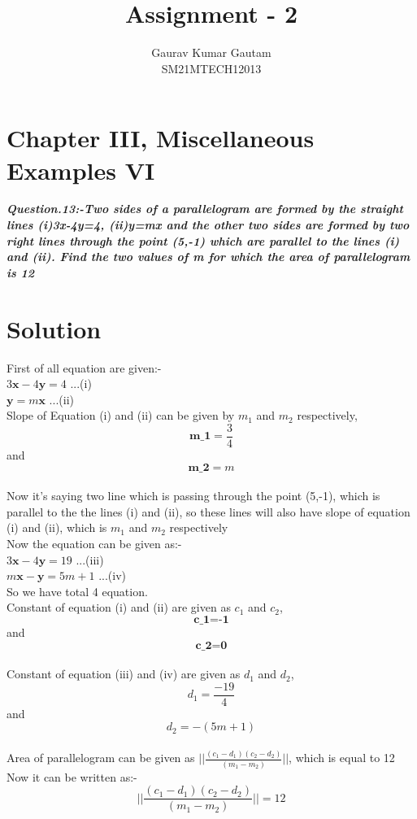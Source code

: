 \documentclass[journal,12pt,twocolumn]{IEEEtran}
\let\vec\mathbf
\begin{document}
\title{
Assignment - 2
}
\author{ Gaurav Kumar Gautam \\SM21MTECH12013}
\maketitle
\newpage
\bigskip

\section*{\textbf{Chapter III, Miscellaneous Examples VI}}
\noindent
\textbf{\textsl{Question.13:-Two sides of a parallelogram are formed by the straight lines (i)3x-4y=4, (ii)y=mx and the other two sides are formed by two right lines through the point (5,-1) which are parallel to the lines (i) and (ii). Find the two values of m for which the area of parallelogram is 12}}\\[6pt]

\section*{\textbf{Solution}}

First of all equation are given:- \\

$3\vec{x}-4\vec{y}=4$          ...(i)\\
$\vec{y}=m\vec{x}$             ...(ii)
\\

Slope of Equation (i) and (ii) can be given by $m_1$ and $m_2$ respectively,
$$\textbf{m_1}=\frac{3}{4}$$ and $$\textbf{m_2}=m$$\\
Now it's saying two line which is passing through the point (5,-1), which is parallel to the the lines (i) and (ii), so these lines will also have slope of equation (i) and (ii), which is $m_1$ and $m_2$ respectively\\
Now the equation can be given as:-\\[6pt]
$3\vec{x}-4\vec{y}=19$     ...(iii)\\
$m\vec{x}-\vec{y}=5m+1$    ...(iv)\\
So we have total 4 equation.\\
Constant of equation (i) and (ii) are given as $c_1$ and $c_2$,\\
$$\textbf{c_1=-1}$$ and $$\textbf{c_2=0}$$\\
Constant of equation (iii) and (iv) are given as $d_1$ and $d_2$,\\
$$d_1=\frac{-19}{4}$$ and $$d_2=-(5m+1)$$\\
Area of parallelogram can be given as $||\frac{(c_1-d_1)(c_2-d_2)}{(m_1-m_2)}||$, which is equal to 12\\
Now it can be written as:-\\
$$||\frac{(c_1-d_1)(c_2-d_2)}{(m_1-m_2)}||=12$$\\
\end{document}
